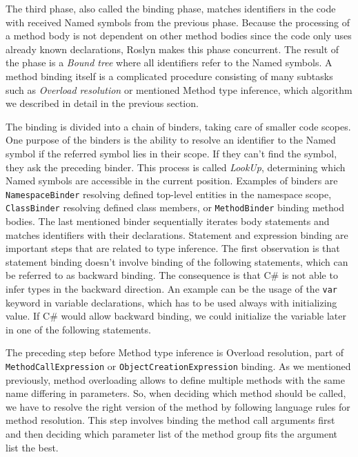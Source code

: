 \par
{}
The third phase, also called the binding phase, matches identifiers in the code with received Named symbols from the previous phase. 
Because the processing of a method body is not dependent on other method bodies since the code only uses already known declarations, Roslyn makes this phase concurrent. 
The result of the phase is a \emph{Bound tree} where all identifiers refer to the Named symbols. 
A method binding itself is a complicated procedure consisting of many subtasks such as \emph{Overload resolution} or mentioned Method type inference, which algorithm we described in detail in the previous section.
\par
{}
The binding is divided into a chain of binders, taking care of smaller code scopes. 
One purpose of the binders is the ability to resolve an identifier to the Named symbol if the referred symbol lies in their scope. 
If they can’t find the symbol, they ask the preceding binder. 
This process is called \emph{LookUp}, determining which Named symbols are accessible in the current position. 
Examples of binders are \texttt{NamespaceBinder} resolving defined top-level entities in the namespace scope, \texttt{ClassBinder} resolving defined class members, or \texttt{MethodBinder} binding method bodies. 
The last mentioned binder sequentially iterates body statements and matches identifiers with their declarations. 
Statement and expression binding are important steps that are related to type inference. 
The first observation is that statement binding doesn’t involve binding of the following statements, which can be referred to as backward binding. 
The consequence is that C\# is not able to infer types in the backward direction. 
An example can be the usage of the \texttt{var} keyword in variable declarations, which has to be used always with initializing value. 
If C\# would allow backward binding, we could initialize the variable later in one of the following statements.
\par
{}
The preceding step before Method type inference is Overload resolution, part of \texttt{MethodCallExpression} or \texttt{ObjectCreationExpression} binding. 
As we mentioned previously, method overloading allows to define multiple methods with the same name differing in parameters. 
So, when deciding which method should be called, we have to resolve the right version of the method by following language rules for method resolution. 
This step involves binding the method call arguments first and then deciding which parameter list of the method group fits the argument list the best. 
